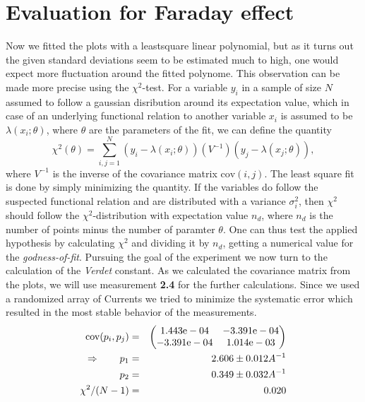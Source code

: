 \section{Evaluation for Faraday effect}
Now we fitted the plots with a leastsquare linear polynomial, but
as it turns out the given standard deviations seem to be estimated much to high,
one would expect more fluctuation 
around the fitted polynome. This observation can be made more 
precise using the $\chi^2$-test. For a variable $y_i$ in a sample of 
size $N$ assumed to follow 
a gaussian disribution around its expectation value, which in case of 
an underlying functional relation to another variable $x_i$ is assumed 
to be $\lambda(x_i; \theta)$, where $\theta$ are the parameters of 
the fit, we can define the quantity
\begin{equation}
    \chi^2(\theta) = \sum_{i, j= 1}^N (y_i - \lambda(x_i; \theta))
        (V^{-1}) (y_j - \lambda(x_j; \theta)), 
\end{equation}
where $V^{-1}$ is the inverse of the covariance matrix $\mathrm{cov}(i,j)$. 
The least square fit is done by simply minimizing the quantity. If the 
variables do follow the suspected functional relation and are distributed 
with a variance $\sigma_i^2$, then $\chi^2$ should follow the 
$\chi^2$-distribution with expectation value $n_d$, where $n_d$ is 
the number of points minus the number of paramter $\theta$.
One can thus test the applied hypothesis by calculating $\chi^2$ and 
dividing it by $n_d$, getting a numerical value for the 
\emph{godness-of-fit}. Pursuing the goal of the experiment we now turn to the 
calculation of the \textit{Verdet} constant. As we calculated the covariance matrix from the
plots, we will use measurement \textbf{2.4} for the further calculations. Since we used
a randomized array of Currents we tried to minimize the systematic error which resulted
in the most stable behavior of the measurements.
\begin{eqnarray}
    \mathrm{cov}(p_i, p_j) &=& 
    \begin{pmatrix}
        1.443\mathrm{e}-04 &-3.391\mathrm{e}-04 \\
        -3.391\mathrm{e}-04 &1.014\mathrm{e}-03 \\
    \end{pmatrix}
\\ \Rightarrow \qquad
    p_1 &=& 2.606 \pm 0.012 A^{-1}\\
    p_2 &=& 0.349 \pm 0.032 A^{-1} \\
    \chi ^2/(N-1) &=&  0.020
\end{eqnarray}

